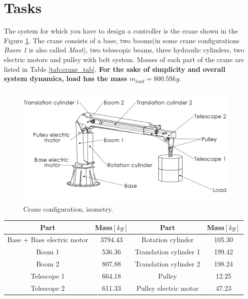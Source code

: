 \documentclass{article}
\begin{document}
	\section{Tasks} \label{sec:tasks}
	
	The system for which you have to design a controller is the crane shown in the Figure \ref{fig:isometry}. The crane consists of a base, two booms(in some crane configurations \textit{Boom 1} is also called \textit{Mast}), two telescopic beams, three hydraulic cylinders, two electric motors and pulley with belt system. Masses of each part of the crane are listed in Table \ref{tab:crane_tab}.\textbf{ For the sake of simplicity and overall system dynamics, load has the mass $m_{load} = 800.59 kg$}.
	
	\begin{figure}[h!]
		\centering
		\includegraphics[width=\textwidth]{kran_teret_izometrija.jpg}
		\caption{Crane configuration, isometry.}
		\label{fig:isometry}
	\end{figure}
	
	\begin{center}
		\label{tab:crane_tab}
		\begin{tabular}{||c|| c || c|| c ||}
			\hline
			Part & Mass$[kg]$ & Part & Mass$[kg]$ \\
			\hline\hline
			Base + Base electric motor & 3794.43 & Rotation cylinder & 105.30\\ 
			\hline
			Boom 1 & 536.36 & Translation cylinder 1 & 199.42\\
			\hline
			Boom 2 & 807.88 & Translation cylinder 2 & 198.24\\
			\hline
			Telescope 1 & 664.18 & Pulley & 12.25\\
			\hline
			Telescope 2 & 611.33 & Pulley electric motor & 47.23\\
			\hline
		\end{tabular}
	\end{center}
	
\end{document}
